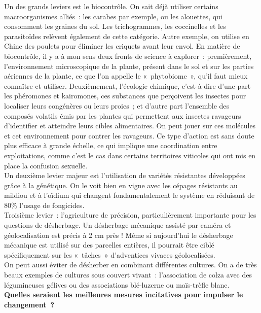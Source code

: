\documentclass[8pt]{article}
\begin{document}
Un des grands leviers est le biocontrôle. On sait déjà utiliser certains macroorganismes alliés~: les carabes par exemple, ou les alouettes, qui consomment les graines du sol. Les trichogrammes, les coccinelles et les parasitoïdes relèvent également de cette catégorie. Autre exemple, on utilise en Chine des poulets pour éliminer les criquets avant leur envol. En matière de biocontrôle, il y a à mon sens deux fronts de science à explorer~: premièrement, l’environnement microscopique de la plante, présent dans le sol et sur les parties aériennes de la plante, ce que l’on appelle le «~phytobiome~», qu’il faut mieux connaître et utiliser. Deuxièmement, l’écologie chimique, c’est-à-dire d’une part les phéromones et kairomones, ces substances que perçoivent les insectes pour localiser leurs congénères ou leurs proies~; et d’autre part l’ensemble des composés volatils émis par les plantes qui permettent aux insectes ravageurs d’identifier et atteindre leurs cibles alimentaires. On peut jouer sur ces molécules et cet environnement pour contrer les ravageurs. Ce type d’action est sans doute plus efficace à grande échelle, ce qui implique une coordination entre exploitations, comme c’est le cas dans certains territoires viticoles qui ont mis en place la confusion sexuelle.\\

Un deuxième levier majeur est l’utilisation de variétés résistantes développées grâce à la génétique. On le voit bien en vigne avec les cépages résistants au mildiou et à l’oïdium qui changent fondamentalement le système en réduisant de 80\% l’usage de fongicides.\\

Troisième levier~: l’agriculture de précision, particulièrement importante pour les questions de désherbage. Un désherbage mécanique assisté par caméra et géolocalisation est précis à 2 cm près ! Même si aujourd’hui le désherbage mécanique est utilisé sur des parcelles entières, il pourrait être ciblé spécifiquement sur les «~tâches~» d’adventices vivaces géolocalisées.\\

On peut aussi éviter de désherber en combinant différentes cultures. On a de très beaux exemples de cultures sous couvert vivant~: l’association de colza avec des légumineuses gélives ou des associations blé-luzerne ou maïs-trèfle blanc.\\

\textbf{Quelles seraient les meilleures mesures incitatives pour impulser le changement~?}\\
\end{document}
